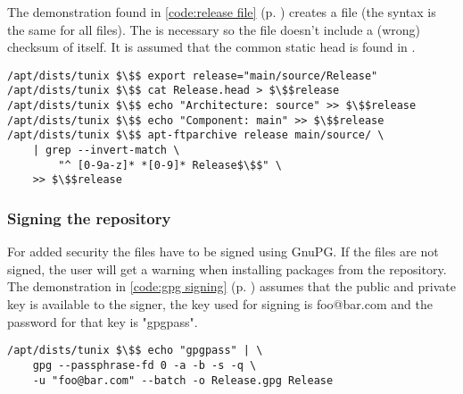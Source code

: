 The demonstration found in \lstlistingname{} \ref{code:release file} (p.
\pageref{code:release file}) creates a  file (the syntax is the
same for all files). The  is
necessary so the file doesn't include a (wrong) checksum of itself. It is
assumed that the common static head is found in .
\begin{lstlisting}[label=code:release file, caption=Creating a Release file,
float=ht]
/apt/dists/tunix $\$$ export release="main/source/Release"
/apt/dists/tunix $\$$ cat Release.head > $\$$release
/apt/dists/tunix $\$$ echo "Architecture: source" >> $\$$release
/apt/dists/tunix $\$$ echo "Component: main" >> $\$$release
/apt/dists/tunix $\$$ apt-ftparchive release main/source/ \
	| grep --invert-match \
		"^ [0-9a-z]* *[0-9]* Release$\$$" \
	>> $\$$release
\end{lstlisting}

\subsubsection{Signing the repository}
For added security the  files have to be signed using GnuPG. If
the files are not signed, the user will get a warning when installing packages
from the repository. The demonstration in \lstlistingname{} \ref{code:gpg
signing} (p. \pageref{code:gpg signing}) assumes that the public and private key
is available to the signer, the key used for signing is foo@bar.com and the
password for that key is "gpgpass".
\begin{lstlisting}[label=code:gpg signing, caption=Signing a Release file,
float=ht]
/apt/dists/tunix $\$$ echo "gpgpass" | \
	gpg --passphrase-fd 0 -a -b -s -q \
	-u "foo@bar.com" --batch -o Release.gpg Release
\end{lstlisting}
